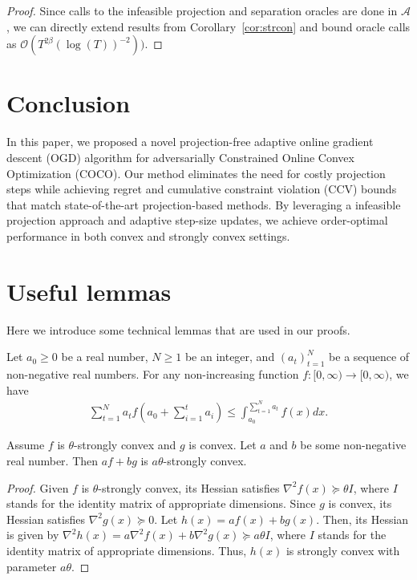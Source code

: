 \documentclass[twoside,11pt,]{article}
\newcommand{\C}[1]{\mathcal{#1}}
\renewcommand{\cite}[1]{\citep{#1}}
\begin{document}
\begin{proof}
    Since calls to the infeasible projection and separation oracles are done in $\C{A}$, we can directly extend results from Corollary~\ref{cor:strcon} and bound oracle calls as $\C{O}(T^{2\beta}(\log(T))^{-2}))$.
\end{proof}

\section{Conclusion}

In this paper, we proposed a novel projection-free adaptive online gradient descent (OGD) algorithm for adversarially Constrained Online Convex Optimization (COCO). Our method eliminates the need for costly projection steps while achieving regret and cumulative constraint violation (CCV) bounds that match state-of-the-art projection-based methods. By leveraging a infeasible projection approach and adaptive step-size updates, we achieve order-optimal performance in both convex and strongly convex settings.  




\newpage



\newpage

\clearpage

\appendix

\section{Useful lemmas}

Here we introduce some technical lemmas that are used in our proofs.

\begin{lemma}[Lemma~4.13 in~\cite{orabona2019modern}]
\label{lem:f}
Let $a_0 \geq 0$ be a real number, $N \geq 1$ be an integer, and $(a_t)_{t = 1}^N$ be a sequence of non-negative real numbers.
For any non-increasing function $f : [0, \infty) \to [0, \infty)$, we have
\begin{align*}
\sum_{t = 1}^N a_t f\left( a_0 + \sum_{i=1}^t a_i \right)
\leq \int_{a_0}^{\sum_{t = 1}^N a_t} f(x) dx.
\end{align*}
\end{lemma}

\begin{lemma}
\label{lem:scalar-stronvex}
    Assume $f$ is $\theta$-strongly convex and $g$ is convex. Let $a$ and $b$ be some non-negative real number. Then $a f + b g$ is $a\theta$-strongly convex.
\end{lemma}
\begin{proof}
    Given $ f $ is $ \theta $-strongly convex, its Hessian satisfies $\nabla^2 f(x) \succeq \theta I$, where $I$ stands for the identity matrix of appropriate dimensions.
    Since $g$ is convex, its Hessian satisfies $\nabla^2 g(x) \succeq 0$.
    Let $h(x) = af(x) + bg(x)$. 
    Then, its Hessian is given by $\nabla^2 h(x) = a \nabla^2 f(x) + b \nabla^2 g(x) \succeq a\theta I$, where $I$ stands for the identity matrix of appropriate dimensions.
    Thus, \( h(x) \) is strongly convex with parameter \( a\theta \).
\end{proof}
\end{document}
